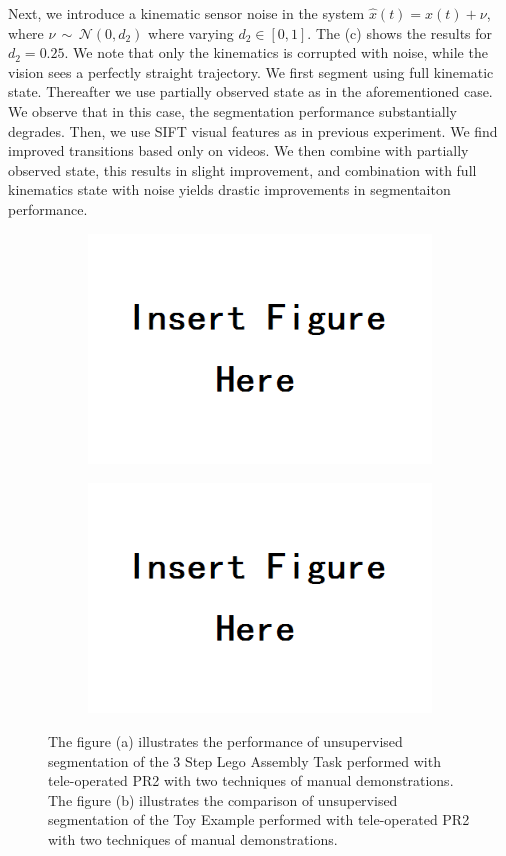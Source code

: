 \documentclass[0-main.tex]{subfiles}
\begin{document}
Next, we introduce a kinematic sensor noise in the system $\hat{x}(t)= x(t)+\nu$, where $\nu\, \sim\, \mathcal{N}(0, d_2)$ where varying $d_2\in[0,1]$. The  (c) shows the results for $d_2=0.25$. We note that only the kinematics is corrupted with noise, while the vision sees a perfectly straight trajectory. We first segment using full kinematic state. Thereafter we use partially observed state as in the aforementioned case. We observe that in this case, the segmentation performance substantially degrades. Then, we use SIFT visual features as in previous experiment. We find improved transitions based only on videos. We then combine with partially observed state, this results in slight improvement, and combination with full kinematics state with noise yields drastic improvements in segmentaiton performance. 

\begin{figure}[t!]
	\centering
	\begin{subfigure}[t]{3.4in}
	    \centering
        \includegraphics[width=0.5\linewidth]{figures/insert}
		\vspace{-5pt}
	\end{subfigure}
	 \hspace{0.1in}
	\begin{subfigure}[t]{3.4in}
	    \centering
		\includegraphics[width=0.5\linewidth]{figures/insert}
		\vspace{-5pt}
	\end{subfigure}
	\caption{The figure (a) illustrates the performance of unsupervised segmentation of the 3 Step Lego Assembly Task performed with tele-operated PR2 with two techniques of manual demonstrations. The figure (b) illustrates the comparison of unsupervised segmentation of the Toy Example performed with tele-operated PR2 with two techniques of manual demonstrations.}
\end{figure}
\end{document}
